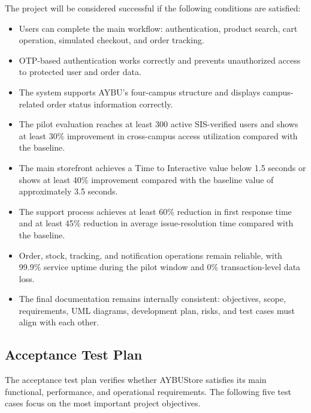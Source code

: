 \documentclass[11pt,a4paper]{article}
\begin{document}
The project will be considered successful if the following conditions
are satisfied:
 
\begin{itemize}[leftmargin=*]
    \item Users can complete the main workflow: authentication, product
    search, cart operation, simulated checkout, and order tracking.
 
    \item OTP-based authentication works correctly and prevents
    unauthorized access to protected user and order data.
 
    \item The system supports AYBU's four-campus structure and displays
    campus-related order status information correctly.
 
    \item The pilot evaluation reaches at least 300 active
    SIS-verified users and shows at least 30\% improvement in
    cross-campus access utilization compared with the baseline.
 
    \item The main storefront achieves a Time to Interactive value
    below 1.5 seconds or shows at least 40\% improvement compared with
    the baseline value of approximately 3.5 seconds.
 
    \item The support process achieves at least 60\% reduction in first
    response time and at least 45\% reduction in average issue-resolution
    time compared with the baseline.
 
    \item Order, stock, tracking, and notification operations remain
    reliable, with 99.9\% service uptime during the pilot window and
    0\% transaction-level data loss.
 
    \item The final documentation remains internally consistent:
    objectives, scope, requirements, UML diagrams, development plan,
    risks, and test cases must align with each other.
\end{itemize}
 
\subsection{Acceptance Test Plan}
 
The acceptance test plan verifies whether AYBUStore satisfies its main
functional, performance, and operational requirements. The following
five test cases focus on the most important project objectives.
 
\end{document}
